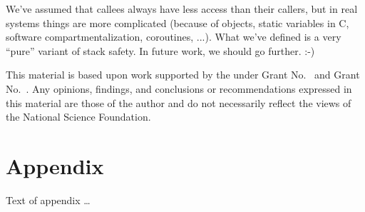 \documentclass[acmsmall,review,anonymous]{acmart}\settopmatter{printfolios=true,printccs=false,printacmref=false}
\begin{document}
We've assumed that callees always have less access than their callers, but
in real systems things are more complicated (because of objects, static
variables in C, software compartmentalization, coroutines, ...).  What we've
defined is a very ``pure'' variant of stack safety.  In future work, we
should go further. :-)


\begin{acks}                            %
  This material is based upon work supported by the
   under Grant
  No.~ and Grant
  No.~.  Any opinions, findings, and
  conclusions or recommendations expressed in this material are those
  of the author and do not necessarily reflect the views of the
  National Science Foundation.
\end{acks}


%


\appendix
\section{Appendix}

Text of appendix \ldots
\end{document}
